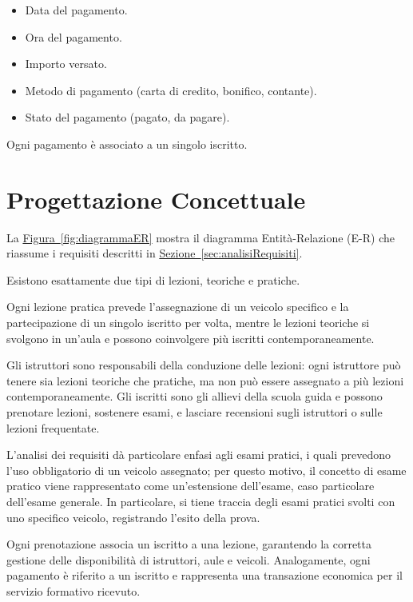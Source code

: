 \documentclass[10pt,twoside]{article}
\begin{document}
{    \begin{itemize}
        \item Data del pagamento.
        \item Ora del pagamento.
        \item Importo versato.
        \item Metodo di pagamento (carta di credito, bonifico, contante).
        \item Stato del pagamento (pagato, da pagare).
    \end{itemize}

    Ogni pagamento è associato a un singolo iscritto.

}

\section{Progettazione Concettuale}{
    \label{sec:progettazioneConcettuale}
    La \hyperref[fig:diagrammaER]{Figura~\ref*{fig:diagrammaER}} mostra il diagramma Entità-Relazione (E-R) che riassume i requisiti descritti in \hyperref[sec:analisiRequisiti]{Sezione~\ref*{sec:analisiRequisiti}}.
    
    Esistono esattamente due tipi di lezioni, teoriche e pratiche.

    Ogni lezione pratica prevede l'assegnazione di un veicolo specifico e la partecipazione di un singolo iscritto per volta, mentre le lezioni teoriche si svolgono in un'aula e possono coinvolgere più iscritti contemporaneamente.

    Gli istruttori sono responsabili della conduzione delle lezioni: ogni istruttore può tenere sia lezioni teoriche che pratiche, ma non può essere assegnato a più lezioni contemporaneamente.
    Gli iscritti sono gli allievi della scuola guida e possono prenotare lezioni, sostenere esami, e lasciare recensioni sugli istruttori o sulle lezioni frequentate.

    L’analisi dei requisiti dà particolare enfasi agli esami pratici, i quali prevedono l’uso obbligatorio di un veicolo assegnato; per questo motivo, il concetto di esame pratico viene rappresentato come un'estensione dell'esame, caso particolare dell'esame generale.
    In particolare, si tiene traccia degli esami pratici svolti con uno specifico veicolo, registrando l’esito della prova.

    Ogni prenotazione associa un iscritto a una lezione, garantendo la corretta gestione delle disponibilità di istruttori, aule e veicoli.
    Analogamente, ogni pagamento è riferito a un iscritto e rappresenta una transazione economica per il servizio formativo ricevuto.

}
\end{document}

